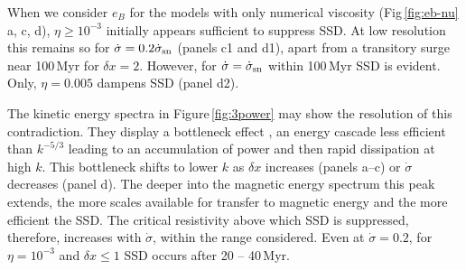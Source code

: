 \documentclass[preprint2]{aastex63}
\newcommand\SNr{\dot\sigma_{\rm sn}}
\newcommand\dx{ {\delta x}}
\begin{document}
 {When we consider $e_B$ for the models {with} only numerical
 viscosity
 (Fig\,\ref{fig:eb-nu} a, c, d), $\eta\geq10^{-3}$ initially appears
 sufficient to suppress SSD.
 At low resolution this remains so for $\dot\sigma=0.2\SNr$ (panels c1 and d1),
 apart from a transitory surge near 100\,Myr for $\dx=2$.
 However, for $\dot\sigma=\SNr$ within 100\,Myr SSD is evident.
 Only, $\eta=0.005$ dampens SSD (panel d2).}

 {The kinetic energy spectra in Figure\,\ref{fig:3power}} may
 show the resolution of this contradiction.
 They display a bottleneck effect \citep{Falkovich94,HBD03}, an energy cascade
 less efficient than $k^{-5/3}$
 leading to an accumulation of power and then rapid dissipation at high $k$.
 This bottleneck shifts to lower $k$ as $\dx$ {increases}
 {(panels a--c) {or $\dot\sigma$ decreases} (panel d).}
 {The deeper into the magnetic energy spectrum this peak extends, the more 
 scales available for transfer to magnetic energy and the more
 efficient the SSD.
 The critical resistivity above which SSD is suppressed, therefore, 
 increases with $\dot\sigma$, within the range considered. 
 Even at $\dot\sigma=0.2$, for $\eta=10^{-3}$ and $\dx\leq1$ SSD occurs after
 20 -- 40\,Myr.}
\end{document}
